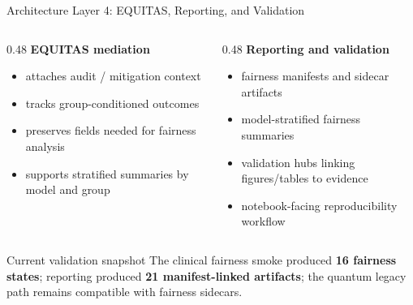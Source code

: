 \documentclass[aspectratio=169,10pt]{beamer}
\begin{document}
\begin{frame}{Architecture Layer 4: EQUITAS, Reporting, and Validation}
\begin{columns}[T]
\begin{column}{0.48\textwidth}
\textbf{EQUITAS mediation}
\begin{itemize}
    \item attaches audit / mitigation context
    \item tracks group-conditioned outcomes
    \item preserves fields needed for fairness analysis
    \item supports stratified summaries by model and group
\end{itemize}
\end{column}
\begin{column}{0.48\textwidth}
\textbf{Reporting and validation}
\begin{itemize}
    \item fairness manifests and sidecar artifacts
    \item model-stratified fairness summaries
    \item validation hubs linking figures/tables to evidence
    \item notebook-facing reproducibility workflow
\end{itemize}
\end{column}
\end{columns}
\vspace{0.45em}
\begin{block}{Current validation snapshot}
The clinical fairness smoke produced \textbf{16 fairness states}; reporting produced \textbf{21 manifest-linked artifacts}; the quantum legacy path remains compatible with fairness sidecars.
\end{block}
\end{frame}
\end{document}
